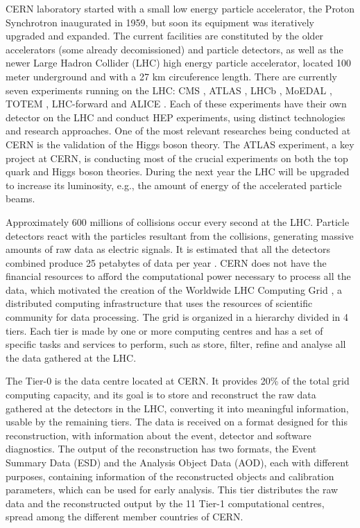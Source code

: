 CERN laboratory started with a small low energy particle accelerator, the Proton Synchrotron \cite{CERN:PS} inaugurated in 1959, but soon its equipment was iteratively upgraded and expanded. The current facilities are constituted by the older accelerators (some already decomissioned) and particle detectors, as well as the newer Large Hadron Collider (LHC) \cite{CERN:LHC} high energy particle accelerator, located 100 meter underground and with a 27 km circuference length. There are currently seven experiments running on the LHC: CMS \cite{CERN:CMS}, ATLAS \cite{CERN:ATLAS}, LHCb \cite{CERN:LHCb}, MoEDAL \cite{CERN:MoEDAL}, TOTEM \cite{CERN:TOTEM}, LHC-forward \cite{CERN:LHCf} and ALICE \cite{CERN:ALICE}. Each of these experiments have their own detector on the LHC and conduct HEP experiments, using distinct technologies and research approaches. One of the most relevant researches being conducted at CERN is the validation of the Higgs boson theory. The ATLAS experiment, a key project at CERN, is conducting most of the crucial experiments on both the top quark and Higgs boson theories. During the next year the LHC will be upgraded to increase its luminosity, e.g., the amount of energy of the accelerated particle beams.

Approximately 600 millions of collisions occur every second at the LHC. Particle detectors react with the particles resultant from the collisions, generating massive amounts of raw data as electric signals. It is estimated that all the detectors combined produce 25 petabytes of data per year \cite{CERN:DATA1,CERN:DATA2}. CERN does not have the financial resources to afford the computational power necessary to process all the data, which motivated the creation of the Worldwide LHC Computing Grid \cite{CERN:WLHCCG}, a distributed computing infrastructure that uses the resources of scientific community for data processing. The grid is organized in a hierarchy divided in 4 tiers. Each tier is made by one or more computing centres and has a set of specific tasks and services to perform, such as store, filter, refine and analyse all the data gathered at the LHC.

The Tier-0 is the data centre located at CERN. It provides 20\% of the total grid computing capacity, and its goal is to store and reconstruct the raw data gathered at the detectors in the LHC, converting it into meaningful information, usable by the remaining tiers. The data is received on a format designed for this reconstruction, with information about the event, detector and software diagnostics. The output of the reconstruction has two formats, the Event Summary Data (ESD) and the Analysis Object Data (AOD), each with different purposes, containing information of the reconstructed objects and calibration parameters, which can be used for early analysis. This tier distributes the raw data and the reconstructed output by the 11 Tier-1 computational centres, spread among the different member countries of CERN.


